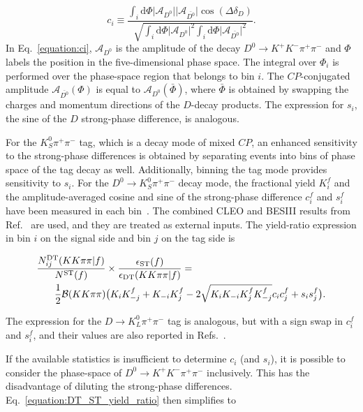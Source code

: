\documentclass[12pt, a4paper, notitlepage, onecolumn]{article}
\newcommand*{\diff}{\mathrm{d}}
\begin{document}
\begin{equation}
    c_i\equiv\frac{\int_i\diff\Phi\lvert\mathcal{A}_{D^0}\rvert\lvert\mathcal{A}_{\bar{D^0}}\rvert\cos(\Delta\delta_D)}{\sqrt{\int_i\diff\Phi\lvert\mathcal{A}_{D^0}\rvert^2\int_i\diff\Phi\lvert\mathcal{A}_{\bar{D^0}}\rvert^2}}.
    \label{equation:ci}
\end{equation}
In Eq.~\eqref{equation:ci}, $\mathcal{A}_{D^0}$ is the amplitude of the decay $D^0\to K^+K^-\pi^+\pi^-$ and $\Phi$ labels the position in the five-dimensional phase space. The integral over $\Phi_i$ is performed over the phase-space region that belongs to bin $i$. The $C\!P$-conjugated amplitude $\mathcal{A}_{\bar{D^0}}(\Phi)$ is equal to $\mathcal{A}_{D^0}(\bar{\Phi})$, where $\bar{\Phi}$ is obtained by swapping the charges and momentum directions of the $D$-decay products. The expression for $s_i$, the sine of the $D$ strong-phase difference, is analogous.

For the $K_S^0\pi^+\pi^-$ tag, which is a decay mode of mixed $C\!P$, an enhanced sensitivity to the strong-phase differences is obtained by separating events into bins of phase space of the tag decay as well. Additionally, binning the tag mode provides sensitivity to $s_i$. For the $D^0\to K^0_S\pi^+\pi^-$ decay mode, the fractional yield $K_i^f$ and the amplitude-averaged cosine and sine of the strong-phase difference $c_i^f$ and $s_i^f$ have been measured in each bin~\cite{cite:KSpipiStrongPhase}. The combined CLEO and BESIII results from Ref.~\cite{cite:KSpipiStrongPhase} are used, and they are treated as external inputs. The yield-ratio expression in bin $i$ on the signal side and bin $j$ on the tag side is~\cite{HarnewS4pi}

\begin{linenomath}
    \begin{align}
        \frac{N_{ij}^{\rm DT}(KK\pi\pi | f)}{N^{\rm ST}(f)}&\times\frac{\epsilon_{\rm ST}(f)}{\epsilon_{\rm DT}(KK\pi\pi | f)} = \nonumber \\
        \frac{1}{2}\mathcal{B}(KK\pi\pi)&\big(K_iK_{-j}^f + K_{-i}K_j^f - 2\sqrt{K_iK_{-i}K_j^fK_{-j}^f}c_ic_j^f + s_is_j^f\big).
        \label{equation:DT_ST_yield_ratio_K0pipi}
    \end{align}
\end{linenomath}
The expression for the $D\to K_L^0\pi^+\pi^-$ tag is analogous, but with a sign swap in $c_i^f$ and $s_i^f$, and their values are also reported in Refs.~\cite{cite:KSpipiStrongPhase}.

If the available statistics is insufficient to determine $c_i$ (and $s_i$), it is possible to consider the phase-space of $D^0\to K^+K^-\pi^+\pi^-$ inclusively. This has the disadvantage of diluting the strong-phase differences. Eq.~\eqref{equation:DT_ST_yield_ratio} then simplifies to
\end{document}

